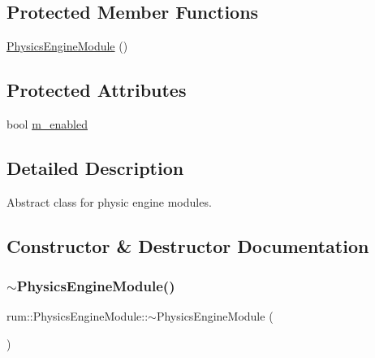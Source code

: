 \subsection*{Protected Member Functions}
\begin{DoxyCompactItemize}
\item 
\hyperlink{classrum_1_1_physics_engine_module_ab94c27f034522f95456f7736b50b6063}{Physics\+Engine\+Module} ()
\end{DoxyCompactItemize}
\subsection*{Protected Attributes}
\begin{DoxyCompactItemize}
\item 
bool \hyperlink{classrum_1_1_physics_engine_module_acf8ef2890d8aed6c265d28e4e0288e88}{m\+\_\+enabled}
\end{DoxyCompactItemize}


\subsection{Detailed Description}
Abstract class for physic engine modules. 

\subsection{Constructor \& Destructor Documentation}
\mbox{\label{classrum_1_1_physics_engine_module_a5ca9d6dd8dc60cec6c562f5aa80ecf64}} 
\subsubsection{\texorpdfstring{$\sim$\+Physics\+Engine\+Module()}{~PhysicsEngineModule()}}
{\footnotesize\ttfamily rum\+::\+Physics\+Engine\+Module\+::$\sim$\+Physics\+Engine\+Module (\begin{DoxyParamCaption}{ }\end{DoxyParamCaption})\hspace{0.3cm}{\ttfamily [virtual]}}

\mbox{\label{classrum_1_1_physics_engine_module_ab94c27f034522f95456f7736b50b6063}} 
